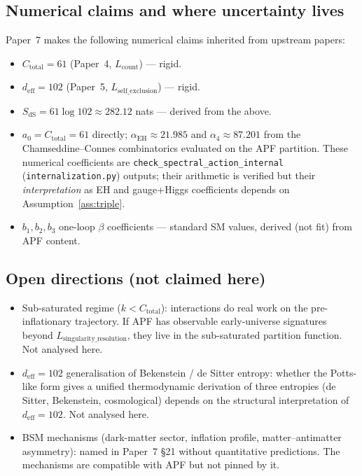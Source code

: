 \documentclass[11pt,a4paper]{article}
\theoremstyle{definition}
\newcommand{\Ctot}{C_{\mathrm{total}}}
\newcommand{\deff}{d_{\mathrm{eff}}}
\newcommand{\coderef}[2]{\texttt{#1}\,(\texttt{#2})}
\begin{document}
\subsection{Numerical claims and where uncertainty lives}

Paper~7 makes the following numerical claims inherited from upstream papers:
\begin{itemize}[leftmargin=*,nosep]
\item $\Ctot=61$ (Paper~4, $L_{\mathrm{count}}$) --- rigid.
\item $\deff=102$ (Paper~5, $L_{\mathrm{self\_exclusion}}$) --- rigid.
\item $S_{\mathrm{dS}}=61\log 102\approx 282.12$ nats --- derived from the above.
\item $a_0=\Ctot=61$ directly; $\alpha_{\mathrm{EH}}\approx 21.985$ and $\alpha_4\approx 87.201$ from the Chamseddine--Connes combinatorics evaluated on the APF partition.  These numerical coefficients are \coderef{check\_spectral\_action\_internal}{internalization.py} outputs; their arithmetic is verified but their \emph{interpretation} as EH and gauge+Higgs coefficients depends on Assumption~\ref{ass:triple}.
\item $b_1, b_2, b_3$ one-loop $\beta$ coefficients --- standard SM values, derived (not fit) from APF content.
\end{itemize}

\subsection{Open directions (not claimed here)}

\begin{itemize}[leftmargin=*,nosep]
\item Sub-saturated regime ($k<\Ctot$): interactions do real work on the pre-inflationary trajectory.  If APF has observable early-universe signatures beyond $L_{\mathrm{singularity\_resolution}}$, they live in the sub-saturated partition function.  Not analysed here.
\item $\deff=102$ generalisation of Bekenstein / de Sitter entropy: whether the Potts-like form gives a unified thermodynamic derivation of three entropies (de Sitter, Bekenstein, cosmological) depends on the structural interpretation of $\deff=102$.  Not analysed here.
\item BSM mechanisms (dark-matter sector, inflation profile, matter--antimatter asymmetry): named in Paper~7 §21 without quantitative predictions.  The mechanisms are compatible with APF but not pinned by it.
\end{itemize}
\end{document}
